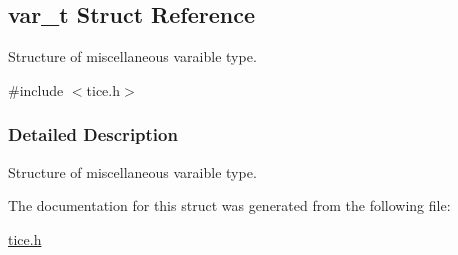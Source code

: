 \hypertarget{structvar__t}{}\subsection{var\+\_\+t Struct Reference}
\label{structvar__t}


Structure of miscellaneous varaible type.  




{\ttfamily \#include $<$tice.\+h$>$}



\subsubsection{Detailed Description}
Structure of miscellaneous varaible type. 

The documentation for this struct was generated from the following file\+:\begin{DoxyCompactItemize}
\item 
\hyperlink{tice_8h}{tice.\+h}\end{DoxyCompactItemize}
